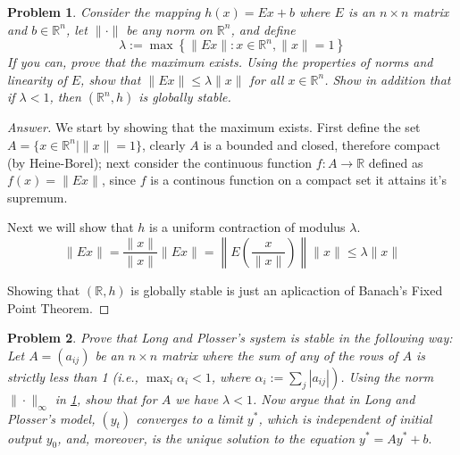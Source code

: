 \documentclass{article}
\newtheorem{problem}{Problem}[section]
\begin{document}
\begin{problem}\label{prob414}
    Consider the mapping $h(x)=E x+b$ where $E$ is an $n \times n$ matrix and $b \in \mathbb{R}^{n}$, let $\|\cdot\|$ be any norm on $\mathbb{R}^{n}$, and define
$$
\lambda:=\max \left\{\|E x\|: x \in \mathbb{R}^{n},\|x\|=1\right\}
$$
If you can, prove that the maximum exists. Using the properties of norms and linearity of $E$, show that $\|E x\| \leq \lambda\|x\|$ for all $x \in \mathbb{R}^{n}$. Show in addition that if $\lambda<1$, then $\left(\mathbb{R}^{n}, h\right)$ is globally stable.
\end{problem}

\begin{proof}[Answer]
    We start by showing that the maximum exists. First define the set $A = \{x\in \mathbb{R}^n\mid \| x\| = 1 \}$, clearly $A$ is a bounded and closed, therefore compact (by Heine-Borel); next consider the continuous function $f:A\to \mathbb{R}$ defined as $f(x) = \|E x\|$, since $f$ is a continous function on a compact set it attains it's supremum.

    Next we will show that $h$ is a uniform contraction of modulus $\lambda$. $$\|Ex\| = \frac{\|x\|}{\|x\|}\|Ex\| =\left\| E \left(\frac{x}{\|x\|} \right)\right\|  \|x\| \leq \lambda \|x\| $$

    Showing that $(\mathbb{R}, h)$ is globally stable is just an aplicaction of Banach's Fixed Point Theorem.
\end{proof}


\begin{problem}\label{prob415}
    Prove that Long and Plosser's system is stable in the following way:
Let $A=\left(a_{i j}\right)$ be an $n \times n$ matrix where the sum of any of the rows of $A$ is strictly less than 1 (i.e., $\max _{i} \alpha_{i}<1$, where $\left.\alpha_{i}:=\sum_{j}\left|a_{i j}\right|\right)$. Using the norm $\|\cdot\|_{\infty}$ in \ref{prob414}, show that for $A$ we have $\lambda<1$. Now argue that in Long and Plosser's model, $\left(y_{t}\right)$ converges to a limit $y^{*}$, which is independent of initial output $y_{0}$, and, moreover, is the unique solution to the equation $y^{*}=A y^{*}+b .$
\end{problem}
\end{document}
